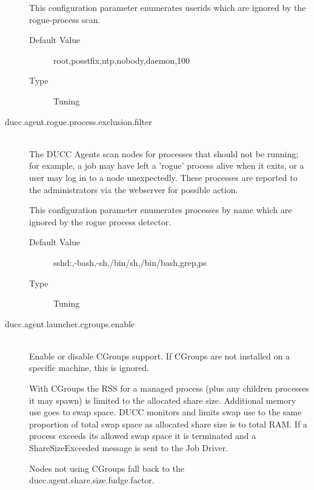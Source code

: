 \begin{description}
            This configuration parameter enumerates userids which are ignored by the rogue-process 
            scan. 
            \begin{description}
            \item[Default Value] root,posstfix,ntp,nobody,daemon,100 
            \item[Type] Tuning 
            \end{description}
            
          \item[ducc.agent.rogue.process.exclusion.filter] \hfill \\
          \label{itm:props-rogue.process}
            The DUCC Agents scan nodes for processes that should not be running; for example, 
            a job may have left a 'rogue' process alive when it exits, or a user may log in to a node 
            unexpectedly. These processes are reported to the administrators via the webserver for 
            possible action. 

            This configuration parameter enumerates processes by name which are ignored by the 
            rogue process detector. 

            \begin{description}
              \item[Default Value] sshd:,-bash,-sh,/bin/sh,/bin/bash,grep,ps 
              \item[Type] Tuning 
            \end{description}
            

		  \label{itm:props-agent.cgroups.enable} 
          \item[ducc.agent.launcher.cgroups.enable] \hfill \\
            Enable or disable CGroups support.
            If CGroups are not installed on a specific machine, this is ignored.

            With CGroups the RSS for a managed process (plus any children processes it may spawn) is
            limited to the allocated share size. Additional memory use goes to swap space. DUCC
            monitors and limits swap use to the same proportion of total swap space as allocated
            share size is to total RAM. If a process exceeds its allowed swap space it is terminated
            and a ShareSizeExceeded message is sent to the Job Driver.

            Nodes not using CGroups fall back to the ducc.agent.share.size.fudge.factor.


\end{description}
